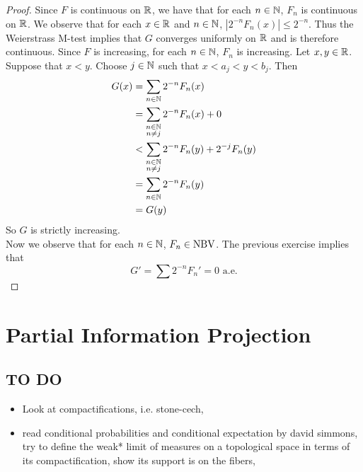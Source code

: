 \documentclass{book}
\begin{document}
	\begin{proof}
		Since $F$ is continuous on $\mathbb{R}$, we have that for each $n \in \mathbb{N}$, $F_n$ is continuous on $\mathbb{R}$. We observe that for each $x \in \mathbb{R}$ and $n \in \mathbb{N}$, $|2^{-n}F_n(x)| \leq 2^{-n}$. Thus the Weierstrass M-test implies that $G$ converges uniformly on $\mathbb{R}$ and is therefore continuous. Since $F$ is increasing, for each $n \in \mathbb{N}$, $F_n$ is increasing. Let $x, y \in \mathbb{R}$. Suppose that $x<y$. Choose $j \in \mathbb{N}$ such that $x<a_j<y<b_j$. Then 
		\begin{align*}
			G(x) 
			&= \sum_{n \in \mathbb{N}}2^{-n}F_n(x)\\
			&= \sum_{\substack{n \in \mathbb{N}\\ n \neq j}}2^{-n}F_n(x) + 0\\
			& < \sum_{\substack{n \in \mathbb{N}\\ n \neq j}}2^{-n}F_n(y) + 2^{-j}F_n(y)\\
			&=\sum_{n \in \mathbb{N}}2^{-n}F_n(y)\\
			&=G(y)
		\end{align*}
		So $G$ is strictly increasing.\\
		Now we observe that for each $n \in \mathbb{N}$, $F_n \in \text{NBV}$. The previous exercise implies that $$G' = \sum 2^{-n}F_n'=0 \text{ a.e.}$$
	\end{proof}
	
	
	
	
	
	
	
	
	
	
	
	
	
	
	
	
	
	
	
	
	
	
	
	
	
	
	
	
	
	
	
	
	
	
	\newpage
	\section{Partial Information Projection}
	
	\subsection{TO DO}
	\begin{itemize}
		\item Look at compactifications, i.e. stone-cech, 
		\item read conditional probabilities and conditional expectation by david simmons, try to define the weak* limit of measures on a topological space in terms of its compactification, show its support is on the fibers,
	\end{itemize}
	
\end{document}
